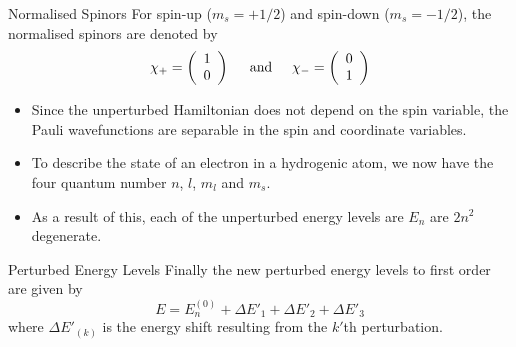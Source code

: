 \documentclass[xcolor=dvipsnames,t]{beamer}
\begin{document}
    \begin{frame}{Normalised Spinors} 
    For spin-up ($m_s = +1/2$) and spin-down ($m_s = -1/2$),
    the normalised spinors are denoted by
    \begin{equation}
        \chi_+ = \left( \begin{array}{c}
                    1 \\ 0
                 \end{array} \right)
        \hspace{5mm} \mathrm{and} \hspace{5mm}
        \chi_- = \left( \begin{array}{c}
                    0 \\ 1
                 \end{array} \right)
    \end{equation}

    \begin{itemize} 
        \item Since the unperturbed Hamiltonian does not depend on the spin variable, the
        Pauli wavefunctions are separable in the spin and coordinate variables.
        \item To describe the state of an electron in a hydrogenic atom, we now have the four
        quantum number $n$, $l$, $m_l$ and $m_s$. 
        \item As a result of this, each of the
        unperturbed energy levels are $E_n$ are $2n^2$ degenerate.
    \end{itemize} 
    \end{frame} 

    \begin{frame}{Perturbed Energy Levels} 
    Finally the new perturbed energy levels to first order are given by
    \begin{equation}
        E = E_{n}^{(0)} + \Delta E'_1 + \Delta E'_2 + \Delta E'_3
    \end{equation}
    where $\Delta E'_{(k)}$ is the energy shift resulting from the $k'$th perturbation.
    \end{frame} 
    
\end{document}
